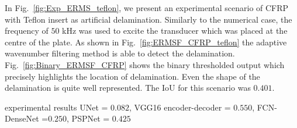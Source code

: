 In Fig.~\ref{fig:Exp_ERMS_teflon}, we present an experimental scenario of CFRP with Teflon insert as artificial delamination.
Similarly to the numerical case, the frequency of \(50\) kHz was used to excite the transducer which was placed at the centre of the plate.
As shown in Fig.~\ref{fig:ERMSF_CFRP_teflon} the adaptive wavenumber filtering method is able to detect the delamination. 
Fig.~\ref{fig:Binary_ERMSF_CFRP} shows the binary thresholded output which precisely highlights the location of delamination. 
Even the shape of the delamination is quite well represented.
The IoU for this scenario was \(0.401\). 


experimental results 
UNet = \(0.082\), VGG16 encoder-decoder = \(0.550\), FCN-DenseNet =\(0.250\), PSPNet = \(0.425\)

